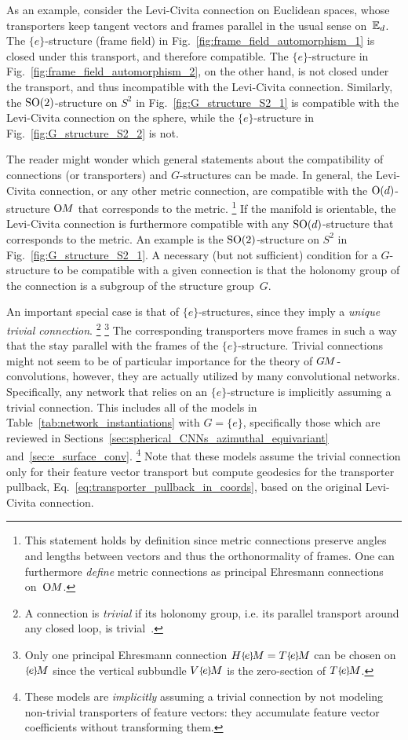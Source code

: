 As an example, consider the Levi-Civita connection on Euclidean spaces, whose transporters keep tangent vectors and frames parallel in the usual sense on~$\mathbb{E}_d$.
The $\{e\}$-structure (frame field) in Fig.~\ref{fig:frame_field_automorphism_1} is closed under this transport, and therefore compatible.
The $\{e\}$-structure in Fig.~\ref{fig:frame_field_automorphism_2}, on the other hand, is not closed under the transport, and thus incompatible with the Levi-Civita connection.
Similarly, the $\operatorname{SO}(2)$-structure on $S^2$ in Fig.~\ref{fig:G_structure_S2_1} is compatible with the Levi-Civita connection on the sphere, while the $\{e\}$-structure in Fig.~\ref{fig:G_structure_S2_2} is not.

The reader might wonder which general statements about the compatibility of connections (or transporters) and $G$-structures can be made.
In general, the Levi-Civita connection, or any other metric connection, are compatible with the $\operatorname{O}(d)$-structure $\operatorname{O}\mkern-3.6muM$ that corresponds to the metric.%
\footnote{
    This statement holds by definition since metric connections preserve angles and lengths between vectors and thus the orthonormality of frames.
    One can furthermore \emph{define} metric connections as principal Ehresmann connections on~$\operatorname{O}\mkern-3.6muM$.
}
If the manifold is orientable, the Levi-Civita connection is furthermore compatible with any $\operatorname{SO}(d)$-structure that corresponds to the metric.
An example is the $\operatorname{SO}(2)$-structure on $S^2$ in Fig.~\ref{fig:G_structure_S2_1}.
A necessary (but not sufficient) condition for a $G$-structure to be compatible with a given connection is that the holonomy group of the connection is a subgroup of the structure group~$G$.

An important special case is that of $\{e\}$-structures, since they imply a \emph{unique trivial connection}.%
\footnote{
    A connection is \emph{trivial} if its holonomy group, i.e. its parallel transport around any closed loop, is trivial~\cite{craneTrivialConnectionsDiscrete2010}.
}%
\footnote{
    Only one principal Ehresmann connection $H\eM = T\eM$ can be chosen on $\eM$ since the vertical subbundle $V\eM$ is the zero-section of $T\eM$.
}
The corresponding transporters move frames in such a way that the stay parallel with the frames of the $\{e\}$-structure.
Trivial connections might not seem to be of particular importance for the theory of $G\mkern-1.4muM$-convolutions, however, they are actually utilized by many convolutional networks.
Specifically, any network that relies on an $\{e\}$-structure is implicitly assuming a trivial connection.
This includes all of the models in Table~\ref{tab:network_instantiations} with $G=\{e\}$, specifically those which are reviewed in Sections~\ref{sec:spherical_CNNs_azimuthal_equivariant} and~\ref{sec:e_surface_conv}.%
\footnote{
    These models are \emph{implicitly} assuming a trivial connection by not modeling non-trivial transporters of feature vectors:
    they accumulate feature vector coefficients without transforming them.
}
Note that these models assume the trivial connection only for their feature vector transport but compute geodesics for the transporter pullback, Eq.~\eqref{eq:transporter_pullback_in_coords}, based on the original Levi-Civita connection.



